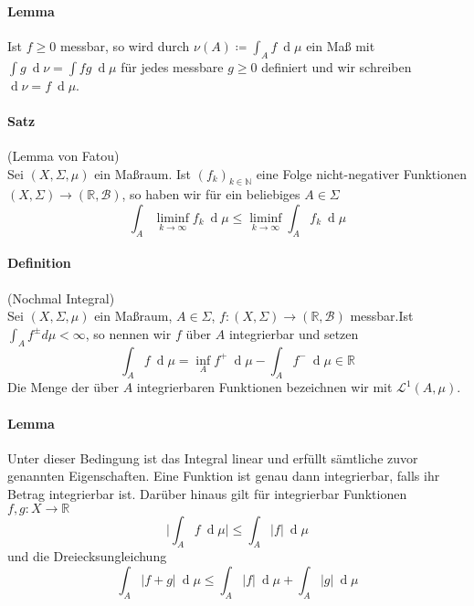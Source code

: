 \documentclass[12pt,a4paper,fleqn]{article}
\def\d{{\operatorname{d}}}
\begin{document}
\paragraph{Lemma} Ist $f \geq 0$ messbar, so wird durch $\nu(A) \coloneqq \int_A f\ \d\mu$ ein Maß mit\linebreak ${\int g\ \d\nu = \int fg\ \d\mu}$ für jedes messbare $g \geq 0$ definiert und wir schreiben $\d\nu = f\ \d\mu$.

\paragraph{Satz} (Lemma von Fatou)\\
Sei $(X, \Sigma, \mu)$ ein Maßraum. Ist $(f_k)_{k \in \mathbb{N}}$ eine Folge nicht-negativer Funktionen\linebreak ${(X, \Sigma) \rightarrow (\mathbb{R}, \mathcal{B})}$, so haben wir für ein beliebiges $A \in \Sigma$
\begin{displaymath}
\int_A \liminf_{k \rightarrow \infty} f_k\ \d\mu \leq \liminf_{k \rightarrow \infty} \int_A f_k\ \d\mu 
\end{displaymath}

\paragraph{Definition} (Nochmal Integral)\\
Sei $(X, \Sigma, \mu)$ ein Maßraum,  $A \in \Sigma$, $f\colon(X, \Sigma) \rightarrow (\mathbb{R}, \mathcal{B})$ messbar.Ist $\int_A f^\pm d\mu < \infty$, so nennen wir $f$ über $A$ integrierbar und setzen
\begin{displaymath}
\int_A f\ \d\mu = \inf_A f^+\ \d\mu - \int_A f^-\ \d\mu \in \mathbb{R}
\end{displaymath}
Die Menge der über $A$ integrierbaren Funktionen bezeichnen wir mit $\mathscr{L}^1(A, \mu)$.

\paragraph{Lemma} Unter dieser Bedingung ist das Integral linear und erfüllt sämtliche zuvor genannten Eigenschaften. Eine Funktion ist genau dann integrierbar, falls ihr Betrag integrierbar ist. Darüber hinaus gilt für integrierbar Funktionen $f, g\colon X \rightarrow \mathbb{R}$
\begin{displaymath}
\bigg|{\int_A f\ \d\mu}\bigg| \leq \int_A \vert{f}\vert\ \d\mu 
\end{displaymath}
und die Dreiecksungleichung
\begin{displaymath}
\int_A \vert{f + g}\vert\ \d\mu \leq \int_A \vert{f}\vert\ \d\mu + \int_A \vert{g}\vert\ \d\mu
\end{displaymath}
\end{document}
